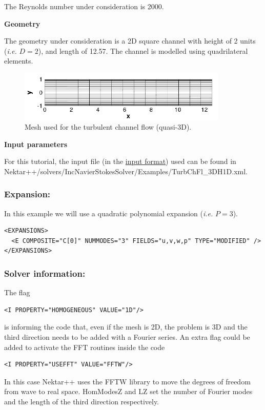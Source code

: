 The Reynolds number under consideration is 2000.

\textbf{Geometry}

The geometry under consideration is a 2D square channel with height of 2 units (\textit{i.e.} $D=2$), and length of 12.57. The channel is modelled using quadrilateral elements.
\begin{figure}
\begin{center}
\includegraphics[width=10cm]{Figures/ChanMesh.png}
\caption{Mesh used for the turbulent channel flow (quasi-3D).}
\end{center}
\end{figure}

\textbf{Input parameters}

For this tutorial, the input file (in the \hyperref[XMLformat]{\nekpp input format}) used can be found in Nektar++/solvers/IncNavierStokesSolver/Examples/TurbChFl\_3DH1D.xml.

\subsubsection{Expansion:~} In this example we will use a quadratic polynomial expansion (\textit{i.e.} $P=3$).
\begin{lstlisting}[style=XMLStyle]
<EXPANSIONS>
  <E COMPOSITE="C[0]" NUMMODES="3" FIELDS="u,v,w,p" TYPE="MODIFIED" />
</EXPANSIONS>
\end{lstlisting}

\subsubsection{Solver information:~} The flag 
\begin{lstlisting}[style=XMLStyle]
<I PROPERTY="HOMOGENEOUS" VALUE="1D"/>
\end{lstlisting}
is informing the code that, even if the mesh is 2D, the problem is 3D and the third direction needs to be added with a Fourier series. An extra flag could be added to activate the FFT routines inside the code 
\begin{lstlisting}[style=XMLStyle]
<I PROPERTY="USEFFT" VALUE="FFTW"/>
\end{lstlisting}
In this case Nektar++ uses the FFTW library to move the degrees of freedom from wave to real space. HomModesZ and LZ set the number of Fourier modes and the length of the third direction respectively.

